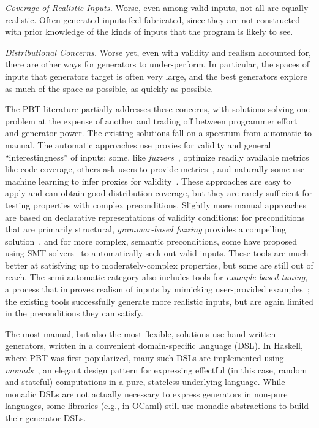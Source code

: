 {\em Coverage of Realistic Inputs.}
Worse, even among valid inputs, not all are equally realistic. Often generated inputs
feel fabricated, since they are not constructed with prior knowledge of the
kinds of inputs that the program is likely to see.

{\em Distributional Concerns.}
Worse yet, even with validity and realism accounted for, there are other ways for
generators to under-perform. In particular, the spaces of inputs that generators
target is often very large, and the best generators explore as much of the space
as possible, as quickly as possible.

The PBT literature partially addresses these concerns, with solutions solving
one problem at the expense of another and trading off between programmer effort
and generator power.
The existing solutions
fall on a spectrum from automatic to manual. The automatic approaches use
proxies for validity and general ``interestingness'' of inputs: some, like {\em
fuzzers}~\cite{afl-readme}, optimize readily available metrics like code
coverage, others ask users to provide metrics~\cite{loscher2017targetedpbt}, and
naturally some use machine learning to infer proxies for
validity~\cite{godefroid2017learn, DBLP:conf/icse/ReddyLPS20}. These approaches
are easy to apply and can obtain good distribution coverage, but they are rarely
sufficient for testing properties with complex preconditions. Slightly more
manual approaches are based on declarative representations of validity
conditions: for preconditions that are primarily structural, {\em grammar-based
fuzzing} provides a compelling solution~\cite{godefroid2008grammar,
holler2012fuzzing, veggalam2016ifuzzer, wang2019superion,
srivastava2021gramatron}, and for more complex, semantic preconditions, some
have proposed using SMT-solvers~\cite{dewey2017automated, LuckPOPL,
steinhofel2022input} to automatically seek out valid inputs. These tools are
much better at satisfying up to moderately-complex properties, but some are
still out of reach. The semi-automatic
category also includes tools for {\em example-based tuning}, a process that
improves realism of inputs by mimicking user-provided
examples~\cite{soremekun2020inputs}; the existing tools successfully generate
more realistic inputs, but are again limited in the preconditions they can
satisfy.

\iflater{}\fi
The most manual, but also the most flexible, solutions use hand-written
generators, written in a convenient domain-specific language (DSL).
In  Haskell, where PBT was
first popularized, many such DSLs are implemented using {\em
monads\/}~\cite{moggi1991notions}, an elegant design pattern for
expressing effectful (in this case, random and stateful) computations
in a pure, stateless underlying
language. While monadic DSLs are not actually necessary to express generators in
non-pure languages, some libraries (e.g., in OCaml) still use monadic
abstractions to build their generator DSLs.

